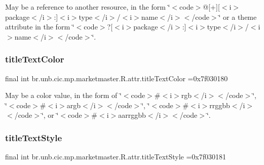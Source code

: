 May be a reference to another resource, in the form \char`\"{}$<$code$>$@\mbox{[}+\mbox{]}\mbox{[}$<$i$>$package$<$/i$>$\+:\mbox{]}$<$i$>$type$<$/i$>$/$<$i$>$name$<$/i$>$$<$/code$>$\char`\"{} or a theme attribute in the form \char`\"{}$<$code$>$?\mbox{[}$<$i$>$package$<$/i$>$\+:\mbox{]}$<$i$>$type$<$/i$>$/$<$i$>$name$<$/i$>$$<$/code$>$\char`\"{}. \mbox{\label{classbr_1_1unb_1_1cic_1_1mp_1_1marketmaster_1_1R_1_1attr_af8a627c74e4cc23cfe884ab8d7ab1869}} 
\subsubsection{\texorpdfstring{title\+Text\+Color}{titleTextColor}}
{\footnotesize\ttfamily final int br.\+unb.\+cic.\+mp.\+marketmaster.\+R.\+attr.\+title\+Text\+Color =0x7f030180\hspace{0.3cm}{\ttfamily [static]}}

May be a color value, in the form of \char`\"{}$<$code$>$\#$<$i$>$rgb$<$/i$>$$<$/code$>$\char`\"{}, \char`\"{}$<$code$>$\#$<$i$>$argb$<$/i$>$$<$/code$>$\char`\"{}, \char`\"{}$<$code$>$\#$<$i$>$rrggbb$<$/i$>$$<$/code$>$\char`\"{}, or \char`\"{}$<$code$>$\#$<$i$>$aarrggbb$<$/i$>$$<$/code$>$\char`\"{}. \mbox{\label{classbr_1_1unb_1_1cic_1_1mp_1_1marketmaster_1_1R_1_1attr_a60fffac10e65d676b30b3853616c1203}} 
\subsubsection{\texorpdfstring{title\+Text\+Style}{titleTextStyle}}
{\footnotesize\ttfamily final int br.\+unb.\+cic.\+mp.\+marketmaster.\+R.\+attr.\+title\+Text\+Style =0x7f030181\hspace{0.3cm}{\ttfamily [static]}}

